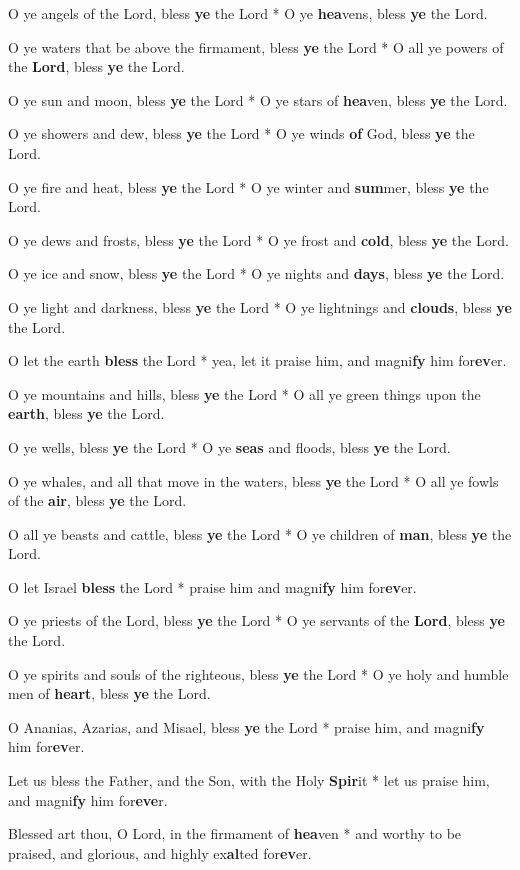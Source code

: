 \begin{multicols}{2}
	O ye angels of the Lord, bless \textbf{ye} the Lord * O ye \textbf{hea}vens, bless \textbf{ye} the Lord.
	
	O ye waters that be above the firmament, bless \textbf{ye} the Lord * O all ye powers of the \textbf{Lord}, bless \textbf{ye} the Lord.
	
	O ye sun and moon, bless \textbf{ye} the Lord * O ye stars of \textbf{hea}ven, bless \textbf{ye} the Lord.
	
	O ye showers and dew, bless \textbf{ye} the Lord * O ye winds \textbf{of} God, bless \textbf{ye} the Lord.
	
	O ye fire and heat, bless \textbf{ye} the Lord * O ye winter and \textbf{sum}mer, bless \textbf{ye} the Lord.
	
	O ye dews and frosts, bless \textbf{ye} the Lord * O ye frost and \textbf{cold}, bless \textbf{ye} the Lord.
	
	O ye ice and snow, bless \textbf{ye} the Lord * O ye nights and \textbf{days}, bless \textbf{ye} the Lord.
	
	O ye light and darkness, bless \textbf{ye} the Lord * O ye lightnings and \textbf{clouds}, bless \textbf{ye} the Lord.
	
	O let the earth \textbf{bless} the Lord * yea, let it praise him, and magni\textbf{fy} him for\textbf{ev}er.
	
	O ye mountains and hills, bless \textbf{ye} the Lord * O all ye green things upon the \textbf{earth}, bless \textbf{ye} the Lord.
	
	O ye wells, bless \textbf{ye} the Lord * O ye \textbf{seas} and floods, bless \textbf{ye} the Lord.
	
	O ye whales, and all that move in the waters, bless \textbf{ye} the Lord * O all ye fowls of the \textbf{air}, bless \textbf{ye} the Lord.
	
	O all ye beasts and cattle, bless \textbf{ye} the Lord * O ye children of \textbf{man}, bless \textbf{ye} the Lord.
	
	O let Israel \textbf{bless} the Lord * praise him and magni\textbf{fy} him for\textbf{ev}er.
	
	O ye priests of the Lord, bless \textbf{ye} the Lord * O ye servants of the \textbf{Lord}, bless \textbf{ye} the Lord.
	
	O ye spirits and souls of the righteous, bless \textbf{ye} the Lord * O ye holy and humble men of \textbf{heart}, bless \textbf{ye} the Lord.
	
	O Ananias, Azarias, and Misael, bless \textbf{ye} the Lord * praise him, and magni\textbf{fy} him for\textbf{ev}er.
	
	Let us bless the Father, and the Son, with the Holy \textbf{Spir}it * let us praise him, and magni\textbf{fy} him for\textbf{eve}r.
	
	Blessed art thou, O Lord, in the firmament of \textbf{hea}ven * and worthy to be praised, and glorious, and highly ex\textbf{al}ted for\textbf{ev}er.
\end{multicols}